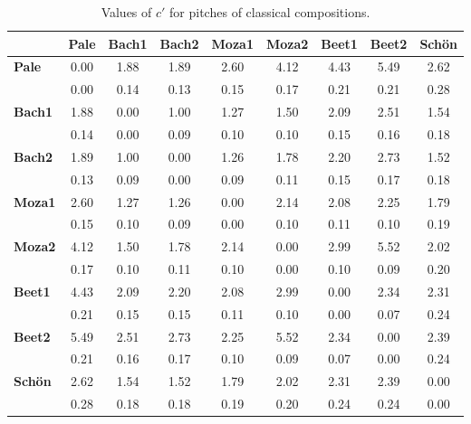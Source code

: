 \begin{table}[h!]
	\caption{Values of $c'$ for pitches of classical compositions.}\label{tab:mus}
\small
\begin{center}
\begin{tabular}{ l | c || c | c || c | c || c | c || c }
 & {\bf Pale} & {\bf Bach1} & {\bf Bach2} & {\bf Moza1} & {\bf Moza2} & {\bf Beet1} & {\bf Beet2} & {\bf Sch\"on} \\\hline
{\bf Pale} & 0.00 & 1.88 & 1.89 & 2.60 & 4.12 & 4.43 & 5.49 & 2.62 \\
 & 0.00  & 0.14  & 0.13  & 0.15  & 0.17  & 0.21  & 0.21  & 0.28 \\\hline\hline
{\bf Bach1} & 1.88 & 0.00 & 1.00 & 1.27 & 1.50 & 2.09 & 2.51 & 1.54 \\
 & 0.14  & 0.00  & 0.09  & 0.10  & 0.10  & 0.15  & 0.16  & 0.18 \\\hline
{\bf Bach2} & 1.89 & 1.00 & 0.00 & 1.26 & 1.78 & 2.20 & 2.73 & 1.52 \\
 & 0.13  & 0.09  & 0.00  & 0.09  & 0.11  & 0.15  & 0.17  & 0.18 \\\hline\hline
{\bf Moza1} & 2.60 & 1.27 & 1.26 & 0.00 & 2.14 & 2.08 & 2.25 & 1.79 \\
 & 0.15  & 0.10  & 0.09  & 0.00  & 0.10  & 0.11  & 0.10  & 0.19 \\\hline
{\bf Moza2} & 4.12 & 1.50 & 1.78 & 2.14 & 0.00 & 2.99 & 5.52 & 2.02 \\
 & 0.17  & 0.10  & 0.11  & 0.10  & 0.00  & 0.10  & 0.09  & 0.20 \\\hline\hline
{\bf Beet1} & 4.43 & 2.09 & 2.20 & 2.08 & 2.99 & 0.00 & 2.34 & 2.31 \\
 & 0.21  & 0.15  & 0.15  & 0.11  & 0.10  & 0.00  & 0.07  & 0.24 \\\hline
{\bf Beet2} & 5.49 & 2.51 & 2.73 & 2.25 & 5.52 & 2.34 & 0.00 & 2.39 \\
 & 0.21  & 0.16  & 0.17  & 0.10  & 0.09  & 0.07  & 0.00  & 0.24 \\\hline\hline
{\bf Sch\"on} & 2.62 & 1.54 & 1.52 & 1.79 & 2.02 & 2.31 & 2.39 & 0.00 \\
 & 0.28  & 0.18  & 0.18  & 0.19  & 0.20  & 0.24  & 0.24  & 0.00 \\
\end{tabular}
\end{center}
\end{table}
